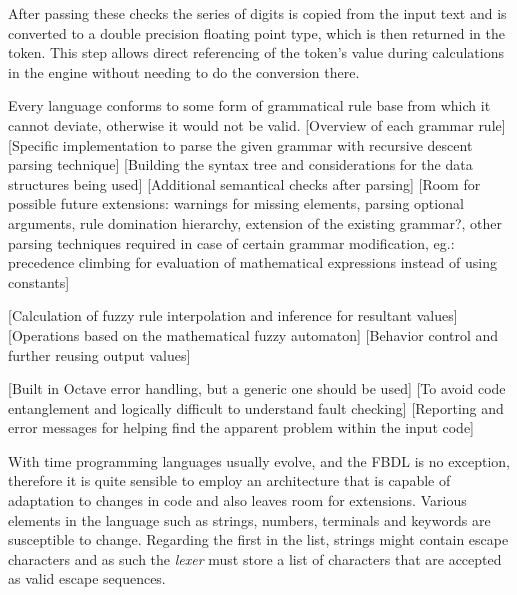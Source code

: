 After passing these checks the series of digits is copied from the input text and is converted to a double precision floating point type, which is then returned in the token. This step allows direct referencing of the token's value during calculations in the engine without needing to do the conversion there.



Every language conforms to some form of grammatical rule base from which it cannot deviate, otherwise it would not be valid.
[Overview of each grammar rule]
[Specific implementation to parse the given grammar with recursive descent parsing technique]
[Building the syntax tree and considerations for the data structures being used]
[Additional semantical checks after parsing]
[Room for possible future extensions: warnings for missing elements, parsing optional arguments, rule domination hierarchy, extension of the existing grammar?, other parsing techniques required in case of certain grammar modification, eg.: precedence climbing for evaluation of mathematical expressions instead of using constants]

[Calculation of fuzzy rule interpolation and inference for resultant values]
[Operations based on the mathematical fuzzy automaton]
[Behavior control and further reusing output values]

[Built in Octave error handling, but a generic one should be used]
[To avoid code entanglement and logically difficult to understand fault checking]
[Reporting and error messages for helping find the apparent problem within the input code]

With time programming languages usually evolve, and the FBDL is no exception, therefore it is quite sensible to employ an architecture that is capable of adaptation to changes in code and also leaves room for extensions. Various elements in the language such as strings, numbers, terminals and keywords are susceptible to change. Regarding the first in the list, strings might contain escape characters and as such the \textit{lexer} must store a list of characters that are accepted as valid escape sequences. 